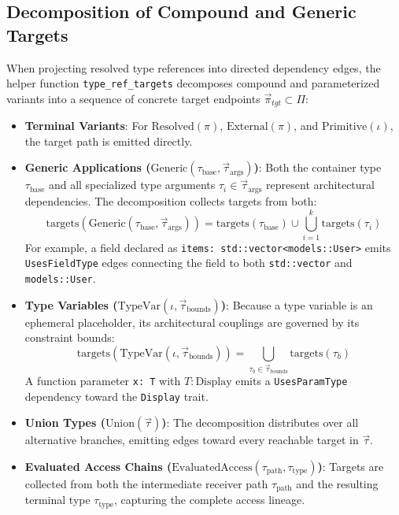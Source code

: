 \subsection{Decomposition of Compound and Generic Targets}
\label{sec:type_ref_targets}

When projecting resolved type references into directed dependency edges,
the helper function \texttt{type\_ref\_targets} decomposes compound
and parameterized
variants into a sequence of concrete target endpoints
$\vec{\pi}_{tgt} \subset \Pi$:

\begin{itemize}
  \item \textbf{Terminal Variants}: For $\text{Resolved}(\pi)$,
    $\text{External}(\pi)$, and $\text{Primitive}(\iota)$, the target path
    is emitted directly.
  \item \textbf{Generic Applications
    ($\text{Generic}(\tau_{\text{base}}, \vec{\tau}_{\text{args}})$)}:
    Both the container type $\tau_{\text{base}}$ and all specialized
    type arguments
    $\tau_i \in \vec{\tau}_{\text{args}}$ represent architectural dependencies.
    The decomposition collects targets from both:
    $$\text{targets}(\text{Generic}(\tau_{\text{base}},
    \vec{\tau}_{\text{args}})) =
    \text{targets}(\tau_{\text{base}}) \cup \bigcup_{i=1}^k
    \text{targets}(\tau_i)$$
    For example, a field declared as \texttt{items: std::vector<models::User>}
    emits \texttt{UsesFieldType} edges connecting the field to both
    \texttt{std::vector}
    and \texttt{models::User}.
  \item \textbf{Type Variables ($\text{TypeVar}(\iota,
    \vec{\tau}_{\text{bounds}})$)}:
    Because a type variable is an ephemeral placeholder, its
    architectural couplings
    are governed by its constraint bounds:
    $$\text{targets}(\text{TypeVar}(\iota, \vec{\tau}_{\text{bounds}})) =
    \bigcup_{\tau_b \in \vec{\tau}_{\text{bounds}}} \text{targets}(\tau_b)$$
    A function parameter \texttt{x: T} with $T: \text{Display}$ emits a
    \texttt{UsesParamType} dependency toward the \texttt{Display} trait.
  \item \textbf{Union Types ($\text{Union}(\vec{\tau})$)}: The decomposition
    distributes over all alternative branches, emitting edges toward every
    reachable target in $\vec{\tau}$.
  \item \textbf{Evaluated Access Chains
    ($\text{EvaluatedAccess}(\tau_{\text{path}}, \tau_{\text{type}})$)}:
    Targets are collected from both the intermediate receiver path
    $\tau_{\text{path}}$
    and the resulting terminal type $\tau_{\text{type}}$, capturing
    the complete access lineage.
\end{itemize}

